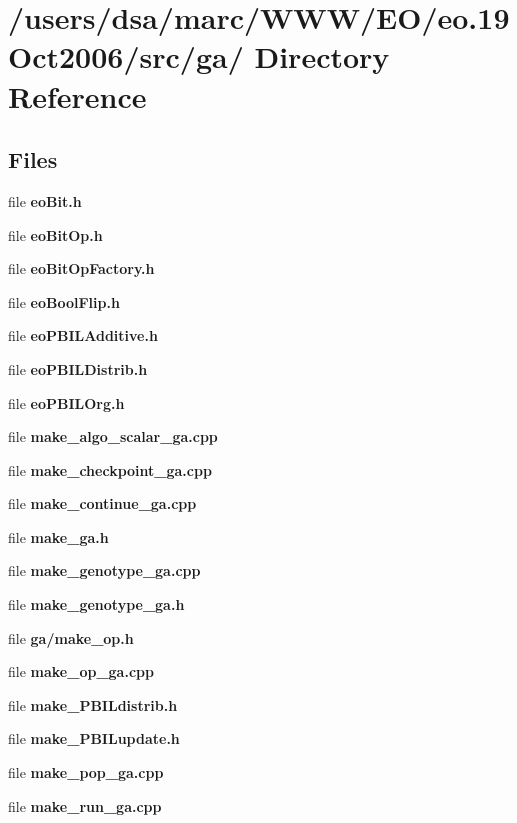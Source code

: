 \section{/users/dsa/marc/WWW/EO/eo.19Oct2006/src/ga/ Directory Reference}
\label{dir_000013}
\subsection*{Files}
\begin{CompactItemize}
\item 
file {\bf eoBit.h}
\item 
file {\bf eoBitOp.h}
\item 
file {\bf eoBitOpFactory.h}
\item 
file {\bf eoBoolFlip.h}
\item 
file {\bf eoPBILAdditive.h}
\item 
file {\bf eoPBILDistrib.h}
\item 
file {\bf eoPBILOrg.h}
\item 
file {\bf make_algo_scalar_ga.cpp}
\item 
file {\bf make_checkpoint_ga.cpp}
\item 
file {\bf make_continue_ga.cpp}
\item 
file {\bf make_ga.h}
\item 
file {\bf make_genotype_ga.cpp}
\item 
file {\bf make_genotype_ga.h}
\item 
file {\bf ga/make_op.h}
\item 
file {\bf make_op_ga.cpp}
\item 
file {\bf make_PBILdistrib.h}
\item 
file {\bf make_PBILupdate.h}
\item 
file {\bf make_pop_ga.cpp}
\item 
file {\bf make_run_ga.cpp}
\end{CompactItemize}
